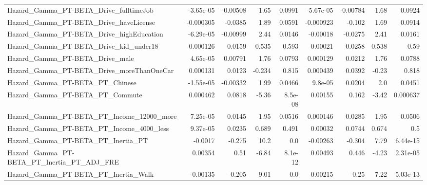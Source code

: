 \begin{tabular}{lrrrrrrrr}
Hazard\_Gamma\_PT-BETA\_Drive\_fulltimeJob             &   -3.65e-05 &     -0.00508 &     1.65 &   0.0991 &  -5.67e-05 &    -0.00784 &         1.68 &        0.0924 \\
Hazard\_Gamma\_PT-BETA\_Drive\_haveLicense             &   -0.000305 &      -0.0385 &     1.89 &   0.0591 &  -0.000923 &      -0.102 &         1.69 &        0.0914 \\
Hazard\_Gamma\_PT-BETA\_Drive\_highEducation           &   -6.29e-05 &     -0.00999 &     2.44 &   0.0146 &   -0.00018 &     -0.0275 &         2.41 &        0.0161 \\
Hazard\_Gamma\_PT-BETA\_Drive\_kid\_under18             &    0.000126 &       0.0159 &    0.535 &    0.593 &    0.00021 &      0.0258 &        0.538 &          0.59 \\
Hazard\_Gamma\_PT-BETA\_Drive\_male                    &    4.65e-05 &      0.00791 &     1.76 &   0.0793 &   0.000129 &      0.0212 &         1.76 &        0.0788 \\
Hazard\_Gamma\_PT-BETA\_Drive\_moreThanOneCar          &    0.000131 &       0.0123 &   -0.234 &    0.815 &   0.000439 &      0.0392 &        -0.23 &         0.818 \\
Hazard\_Gamma\_PT-BETA\_PT\_Chinese                    &   -1.55e-05 &     -0.00332 &     1.99 &   0.0466 &    9.8e-05 &      0.0204 &          2.0 &        0.0451 \\
Hazard\_Gamma\_PT-BETA\_PT\_Commute                    &    0.000462 &       0.0818 &    -5.36 &  8.5e-08 &    0.00155 &       0.162 &        -3.42 &      0.000637 \\
Hazard\_Gamma\_PT-BETA\_PT\_Income\_12000\_more          &    7.25e-05 &       0.0145 &     1.95 &   0.0516 &   0.000146 &      0.0285 &         1.95 &        0.0506 \\
Hazard\_Gamma\_PT-BETA\_PT\_Income\_4000\_less           &    9.37e-05 &       0.0235 &    0.689 &    0.491 &    0.00032 &      0.0744 &        0.674 &           0.5 \\
Hazard\_Gamma\_PT-BETA\_PT\_Inertia\_PT                 &     -0.0017 &       -0.275 &     10.2 &      0.0 &   -0.00263 &      -0.304 &         7.79 &      6.44e-15 \\
Hazard\_Gamma\_PT-BETA\_PT\_Inertia\_PT\_ADJ\_FRE         &     0.00354 &         0.51 &    -6.84 &  8.1e-12 &    0.00493 &       0.446 &        -4.23 &      2.31e-05 \\
Hazard\_Gamma\_PT-BETA\_PT\_Inertia\_Walk               &    -0.00135 &       -0.205 &     9.01 &      0.0 &   -0.00215 &       -0.25 &         7.22 &      5.03e-13 \\

\end{tabular}
